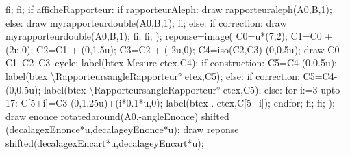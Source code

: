 {\begin{Geometrie}[CoinBG=\RapporteursCoinBG,CoinHD=\RapporteursCoinHD]
         fi;
      fi;
      if afficheRapporteur:
         if rapporteurAleph:
            draw rapporteuraleph(A0,B,1);
         else:
            draw myrapporteurdouble(A0,B,1);
         fi;
      else:
         if correction:
            draw myrapporteurdouble(A0,B,1);
         fi;
      fi;
    );
    reponse=image(
      C0=u*(7,2);
      C1=C0 + (2u,0); 
      C2=C1 + (0,1.5u);
      C3=C2 + (-2u,0);
      C4=iso(C2,C3)-(0,0.5u);       
      draw C0--C1--C2--C3--cycle;
      label(btex Mesure etex,C4);
      if construction:
         C5=C4-(0,0.5u);
         label(btex \ang{\RapporteursangleRapporteur} etex,C5);      
      else:
         if correction:
            C5=C4-(0,0.5u);
            label(btex {\red \ang{\RapporteursangleRapporteur}} etex,C5);      
         else:
            for i:=3 upto 17:
               C[5+i]=C3-(0,1.25u)+(i*0.1*u,0);
               label(btex . etex,C[5+i]);
            endfor;%
         fi;
      fi;
    );
    draw enonce rotatedaround(A0,-angleEnonce) shifted (decalagexEnonce*u,decalageyEnonce*u);
    draw reponse shifted(decalagexEncart*u,decalageyEncart*u);     
 \end{Geometrie}
}

